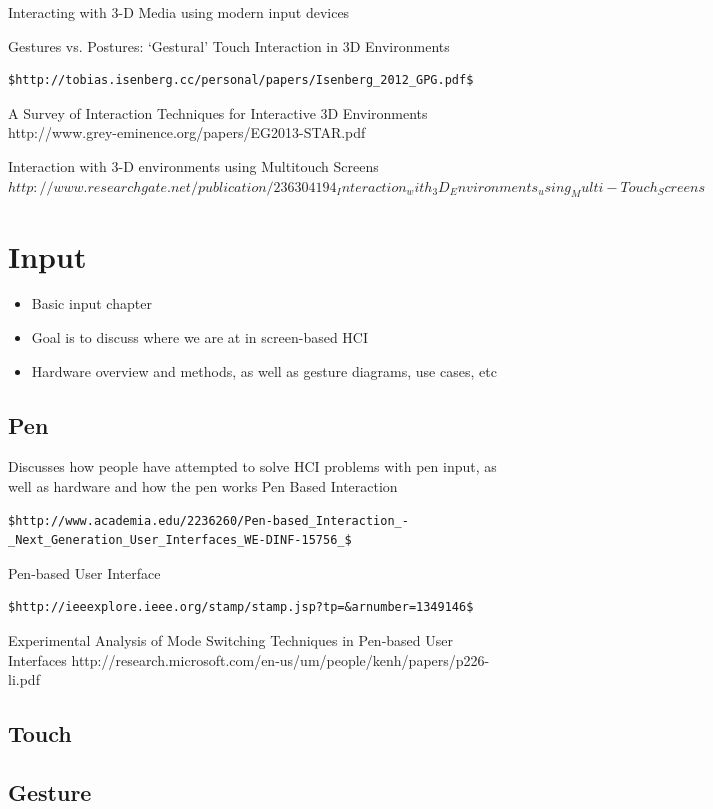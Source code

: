 \documentclass[12pt]{report}
\begin{document}
Interacting with 3-D Media using modern input devices

Gestures vs. Postures: ‘Gestural’ Touch Interaction in 3D Environments 

\begin{verbatim}
$http://tobias.isenberg.cc/personal/papers/Isenberg_2012_GPG.pdf$
\end{verbatim}
A Survey of Interaction Techniques for Interactive 3D Environments http://www.grey-eminence.org/papers/EG2013-STAR.pdf

Interaction with 3-D environments using Multitouch Screens $http://www.researchgate.net/publication/236304194_Interaction_with_3D_Environments_using_Multi-Touch_Screens$

\pagebreak
\section{Input}

\begin{itemize}
\item Basic input chapter
\item Goal is to discuss where we are at in screen-based HCI
\item Hardware overview and methods, as well as gesture diagrams, use cases, etc
\end{itemize}
\subsection{Pen}

Discusses how people have attempted to solve HCI problems with pen input, as well as hardware and how the pen works 
Pen Based Interaction 
\begin{verbatim}
$http://www.academia.edu/2236260/Pen-based_Interaction_-_Next_Generation_User_Interfaces_WE-DINF-15756_$
\end{verbatim}
Pen-based User Interface 
\begin{verbatim}
$http://ieeexplore.ieee.org/stamp/stamp.jsp?tp=&arnumber=1349146$
\end{verbatim}
Experimental Analysis of Mode Switching Techniques in Pen-based User Interfaces http://research.microsoft.com/en-us/um/people/kenh/papers/p226-li.pdf
\subsection{Touch}

\subsection{Gesture}
\end{document}
